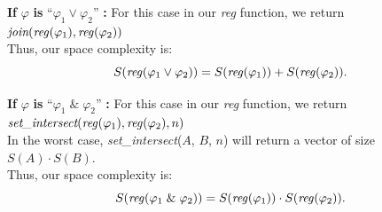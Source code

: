 \documentclass[runningheads]{llncs}
\renewcommand{\phi}{\varphi}
\begin{document}
\textbf{If} $\phi$ \textbf{is} ``$\phi_{1} \lor \phi_{2}$'' \textbf{:}
    For this case in our \emph{reg} function, we return $\textit{join}(\text{\emph{reg}}(\phi_{1}), \text{\emph{reg}}(\phi_{2}))$ \\
    Thus, our space complexity is:
    \[
    S(\text{\emph{reg}}(\phi_{1} \lor \phi_{2})) = S(\text{\emph{reg}}(\phi_{1})) + S(\text{\emph{reg}}(\phi_{2})).
    \]
 

\textbf{If} $\phi$ \textbf{is} ``$\phi_{1} \; \& \; \phi_{2}$'' \textbf{:}
    For this case in our \emph{reg} function, we return $ \textit{set\_intersect}(\text{\emph{reg}}(\phi_{1}), \text{\emph{reg}}(\phi_{2}), n)$ \\
    In the worst case, \textit{set\_intersect}($A$, $B$, $n$) will return a vector of size $S(A) \cdot S(B)$.\\
    Thus, our space complexity is:
    \[ 
    S(\text{\emph{reg}}(\phi_{1} \; \& \; \phi_{2})) = S(\text{\emph{reg}}(\phi_{1})) \cdot S(\text{\emph{reg}}(\phi_{2})).
    \]
\end{document}
